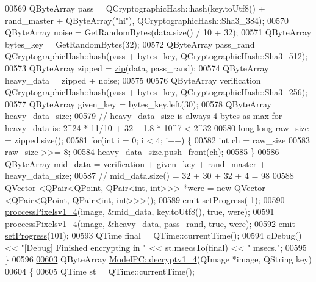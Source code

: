 \begin{DoxyCode}
00569     QByteArray pass = QCryptographicHash::hash(key.toUtf8() + rand\_master + QByteArray(\textcolor{stringliteral}{"hi"}), 
      QCryptographicHash::Sha3\_384);
00570     QByteArray noise = GetRandomBytes(data.size() / 10 + 32);
00571     QByteArray bytes\_key = GetRandomBytes(32);
00572     QByteArray pass\_rand = QCryptographicHash::hash(pass + bytes\_key, QCryptographicHash::Sha3\_512);
00573     QByteArray zipped = \hyperlink{class_model_p_c_afebbbfa4b07deba4f68fc6dfb50f353f}{zip}(data, pass\_rand);
00574     QByteArray heavy\_data = zipped + noise;
00575 
00576     QByteArray verification = QCryptographicHash::hash(pass + bytes\_key, QCryptographicHash::Sha3\_256);
00577     QByteArray given\_key = bytes\_key.left(30);
00578     QByteArray heavy\_data\_size;
00579     \textcolor{comment}{// heavy\_data\_size is always 4 bytes as max for heavy\_data is: 2^24 * 11/10 + 32 ~ 1.8 * 10^7 < 2^32}
00580     \textcolor{keywordtype}{long} \textcolor{keywordtype}{long} raw\_size = zipped.size();
00581     \textcolor{keywordflow}{for}(\textcolor{keywordtype}{int} i = 0; i < 4; i++) \{
00582         \textcolor{keywordtype}{int} ch = raw\_size %
00583         raw\_size >>= 8;
00584         heavy\_data\_size.push\_front(ch);
00585     \}
00586     QByteArray mid\_data = verification + given\_key + rand\_master + heavy\_data\_size;
00587     \textcolor{comment}{// mid\_data.size() = 32 + 30 + 32 + 4 = 98}
00588     QVector <QPair<QPoint, QPair<int, int>>> *were = \textcolor{keyword}{new} QVector <QPair<QPoint, QPair<int, int>>>();
00589     emit \hyperlink{class_model_p_c_afdcd80f0ed5062e145a71f09b0897547}{setProgress}(-1);
00590     \hyperlink{class_model_p_c_a5cdb4d1d61ff62ee9d45b496a7dbf1fb}{proccessPixelsv1\_4}(image, &mid\_data, key.toUtf8(), \textcolor{keyword}{true}, were);
00591     \hyperlink{class_model_p_c_a5cdb4d1d61ff62ee9d45b496a7dbf1fb}{proccessPixelsv1\_4}(image, &heavy\_data, pass\_rand, \textcolor{keyword}{true}, were);
00592     emit \hyperlink{class_model_p_c_afdcd80f0ed5062e145a71f09b0897547}{setProgress}(101);
00593     QTime \textcolor{keyword}{final} = QTime::currentTime();
00594     qDebug() << \textcolor{stringliteral}{"[Debug] Finished encrypting in "} << st.msecsTo(\textcolor{keyword}{final}) << \textcolor{stringliteral}{" msecs."};
00595 \}
00596 
\hypertarget{modelpc_8cpp_source.tex_l00603}{}\hyperlink{class_model_p_c_a7a1f7d491e1bde16936190b9e90896b0}{00603} QByteArray \hyperlink{class_model_p_c_a7a1f7d491e1bde16936190b9e90896b0}{ModelPC::decryptv1\_4}(QImage *image, QString key)
00604 \{
00605     QTime st = QTime::currentTime();

\end{DoxyCode}
